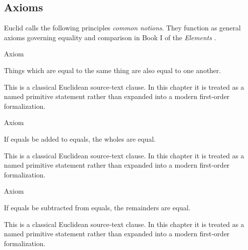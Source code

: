 \subsection*{Axioms}

\begin{remark*}
Euclid calls the following principles \textit{common notions}. They function as
general axioms governing equality and comparison in Book I of the
\textit{Elements} \citep[Book I, Common Notions 1--5]{euclid-elements-heath}.
\end{remark*}


\begin{axiombox}{Axiom}
\begin{axiom}
\label{ax:euclid-common-notion-things-equal-to-same}
Things which are equal to the same thing are also equal to one another.
\end{axiom}
\end{axiombox}
\begin{remark*}
This is a classical Euclidean source-text clause. In this chapter it is treated
as a named primitive statement rather than expanded into a modern first-order
formalization.
\end{remark*}

\begin{lra-not-visible}
\NoLocalDependencies
\end{lra-not-visible}

\begin{axiombox}{Axiom}
\begin{axiom}
\label{ax:euclid-common-notion-add-equals}
If equals be added to equals, the wholes are equal.
\end{axiom}
\end{axiombox}
\begin{remark*}
This is a classical Euclidean source-text clause. In this chapter it is treated
as a named primitive statement rather than expanded into a modern first-order
formalization.
\end{remark*}

\begin{lra-not-visible}
\NoLocalDependencies
\end{lra-not-visible}

\begin{axiombox}{Axiom}
\begin{axiom}
\label{ax:euclid-common-notion-subtract-equals}
If equals be subtracted from equals, the remainders are equal.
\end{axiom}
\end{axiombox}
\begin{remark*}
This is a classical Euclidean source-text clause. In this chapter it is treated
as a named primitive statement rather than expanded into a modern first-order
formalization.
\end{remark*}

